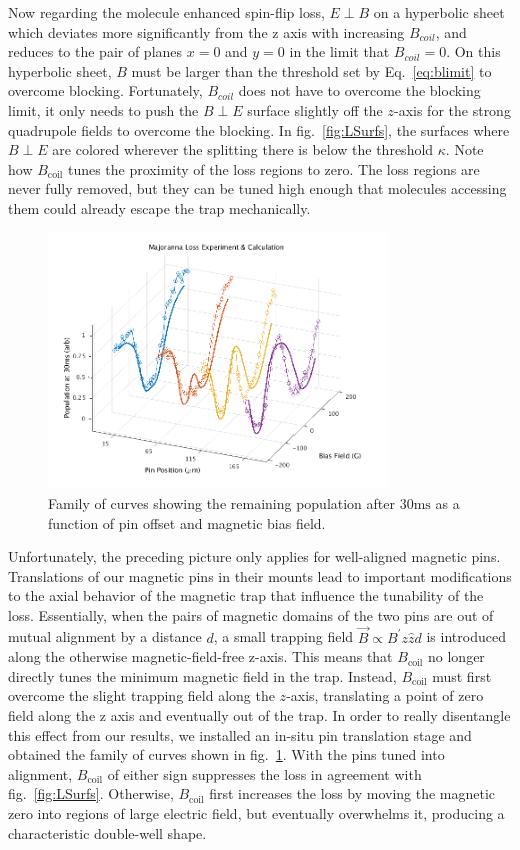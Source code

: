 \documentclass[%
 reprint,
 amsmath,amssymb,
 aps,
prl,
]{revtex4-1}
\begin{document}
Now regarding the molecule enhanced spin-flip loss, $E\!\perp\! B$ on a hyperbolic sheet which deviates more significantly from the z axis with increasing $B_{coil}$, and reduces to the pair of planes $x=0$ and $y=0$ in the limit that $B_{coil} = 0$. On this hyperbolic sheet, $B$ must be larger than the threshold set by Eq.~\ref{eq:blimit} to overcome blocking. Fortunately, $B_{coil}$ does not have to overcome the blocking limit, it only needs to push the $B\!\perp\! E$ surface slightly off the $z$-axis for the strong  quadrupole fields to overcome the blocking. In fig.~\ref{fig:LSurfs}, the surfaces where $B\!\perp\! E$ are colored wherever the splitting there is below the threshold $\kappa$. Note how $B_\text{coil}$ tunes the proximity of the loss regions to zero. The loss regions are never fully removed, but they can be tuned high enough that molecules accessing them could already escape the trap mechanically.

\begin{figure}
\includegraphics[width=90mm]{V-to-W-plot-3D-dave.png}%
\caption{
Family of curves showing the remaining population after $30 \text{ms}$ as a function of pin offset and magnetic bias field.
\label{fig:WVplot}}
\end{figure}

Unfortunately, the preceding picture only applies for well-aligned magnetic pins. Translations of our magnetic pins in their mounts lead to important modifications to the axial behavior of the magnetic trap that influence the tunability of the loss. Essentially, when the pairs of magnetic domains of the two pins are out of mutual alignment by a distance $d$, a small trapping field $\vec{B}\propto B^\prime z\hat{z} d$ is introduced along the otherwise magnetic-field-free z-axis. This means that $B_\text{coil}$ no longer directly tunes the minimum magnetic field in the trap. Instead, $B_\text{coil}$ must first overcome the slight trapping field along the $z$-axis, translating a point of zero field along the z axis and eventually out of the trap. In order to really disentangle this effect from our results, we installed an in-situ pin translation stage and obtained the family of curves shown in fig.~\ref{fig:WVplot}. With the pins tuned into alignment, $B_\text{coil}$ of either sign suppresses the loss in agreement with fig.~\ref{fig:LSurfs}. Otherwise, $B_\text{coil}$ first increases the loss by moving the magnetic zero into regions of large electric field, but eventually overwhelms it, producing a characteristic double-well shape. 
\end{document}
